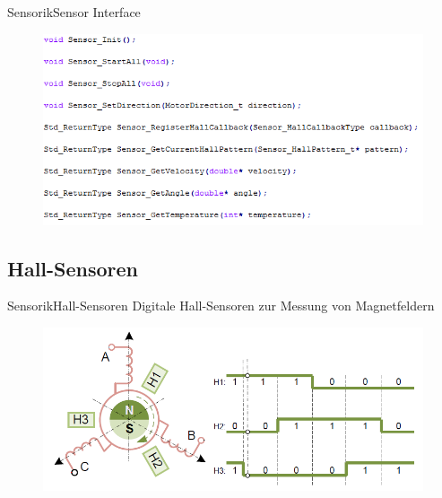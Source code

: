\begin{frame}{Sensorik}{Sensor Interface}	
 \begin{figure} [htbp]
  \centering
  \includegraphics[scale=0.6]{Sensor/sensor_interface.PNG}
 \end{figure}
\end{frame}


\subsection{Hall-Sensoren}

\begin{frame}{Sensorik}{Hall-Sensoren}	
 Digitale Hall-Sensoren zur Messung von Magnetfeldern
 \begin{figure} [htbp]
  \centering
  \includegraphics[scale=0.4]{Sensor/hall_sample.PNG}
 \end{figure}
\end{frame}

